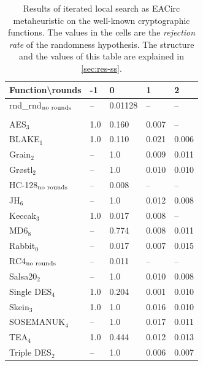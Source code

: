 \documentclass[
    digital,    %
    oneside,    %
    color,
    11pt,
    nocover,
    notable,
    nolof,
    nolot,
]{fithesis3}
\newcommand{\fd}{\cellcolor{red!25}}
\newcommand{\fn}{}
\begin{document}
\begin{table}[t]
\centering
\begin{tabular}{l|l l l l}
\textbf{\large Function\textbackslash{}rounds} & \textbf{\large -1} & \textbf{\large 0} & \textbf{\large 1} & \textbf{\large 2}\\ \hline
rnd\_rnd$_{\textnormal{no rounds}}$ & --  & \fn{}0.01128& --   & -- \\\\
AES$_{3}$        & \fd{}1.0   & \fd{}0.160 & \fn{}0.007 & \fn{}--   \\
BLAKE$_{1}$      & \fd{}1.0   & \fd{}0.110 & \fn{}0.021 & \fn{}0.006\\
Grain$_{2}$      & \fd{}--    & \fd{}1.0   & \fn{}0.009 & \fn{}0.011\\
Gr\o stl$_{2}$   & \fd{}--    & \fd{}1.0   & \fn{}0.010 & \fn{}0.010\\
HC-128$_{\textnormal{no rounds}}$& -- & \fn{}0.008 & -- & --        \\
JH$_{6}$         & \fd{}--    & \fd{}1.0   & \fn{}0.012 & \fn{}0.008\\
Keccak$_{3}$     & \fd{}1.0   & \fn{}0.017 & \fn{}0.008 & \fn{}--   \\
MD6$_{8}$        & \fd{}--    & \fd{}0.774 & \fn{}0.008 & \fn{}0.011\\
Rabbit$_{0}$     &      --    & \fn{}0.017 & \fn{}0.007 & \fn{}0.015\\
RC4$_{\textnormal{no rounds}}$& -- & \fn{}0.011 & --    & --        \\
Salsa20$_{2}$    & \fd{}--    & \fd{}1.0   & \fn{}0.010 & \fn{}0.008\\
Single DES$_{4}$ & \fd{}1.0   & \fd{}0.204 & \fn{}0.001 & \fn{}0.010\\
Skein$_{3}$      & \fd{}1.0   & \fd{}1.0   & \fn{}0.016 & \fn{}0.010\\
SOSEMANUK$_{4}$  & \fd{}--    & \fd{}1.0   & \fn{}0.017 & \fn{}0.011\\
TEA$_{4}$        & \fd{}1.0   & \fd{}0.444 & \fn{}0.012 & \fn{}0.013\\
Triple DES$_{2}$ & \fd{}--    & \fd{}1.0   & \fn{}0.006 & \fn{}0.007
\end{tabular}
\caption{Results of iterated local search as EACirc metaheuristic on the well-known cryptographic functions. The values in the cells are the \textit{rejection rate} of the randomness hypothesis. The structure and the values of this table are explained in \cref{sec:res-ss}.}
\label{table:res-usable-ils}
\end{table}
\end{document}
